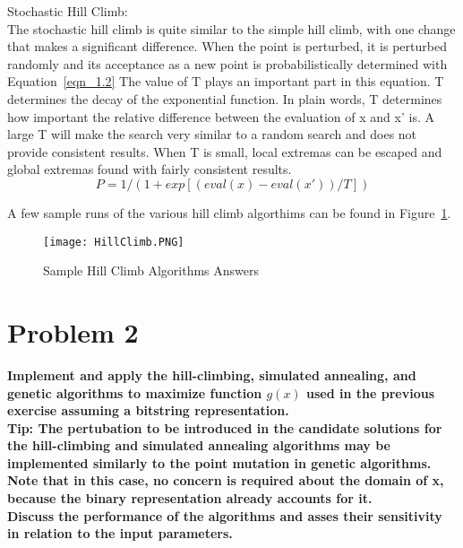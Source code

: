 Stochastic Hill Climb: \\

The stochastic hill climb is quite similar to the simple hill climb, with one change that makes a significant difference. When the point is perturbed, it is perturbed randomly and its acceptance as a new point is probabilistically determined with Equation~\ref{eqn_1.2} The value of T plays an important part in this equation. T determines the decay of the exponential function. In plain words, T determines how important the relative difference between the evaluation of x and x' is. A large T will make the search very similar to a random search and does not provide consistent results. When T is small, local extremas can be escaped and global extremas found with fairly consistent results.  \\

\begin{equation}\label{eqn_1.2}
P = 1 / ( 1 + exp[ ( eval(x) - eval(x') ) / T ] )
\end{equation}

A few sample runs of the various hill climb algorthims can be found in Figure~\ref{hill_climb}.


\begin{figure}[tbh]
\begin{center}
\texttt{[image: HillClimb.PNG]}
\end{center}
\caption{Sample Hill Climb Algorithms Answers \label{hill_climb} }
\end{figure}


\newpage
\section{Problem 2}
\textbf{Implement and apply the hill-climbing, simulated annealing, and genetic algorithms to maximize function $g(x)$ used in the previous exercise assuming a bitstring representation.} \newline \\
\textbf{Tip: The pertubation to be introduced in the candidate solutions for the hill-climbing and simulated annealing algorithms may be implemented similarly to the point mutation in genetic algorithms. Note that in this case, no concern is required about the domain of x, because the binary representation already accounts for it.} \newline \\
\textbf{Discuss the performance of the algorithms and asses their sensitivity in relation to the input parameters.}

